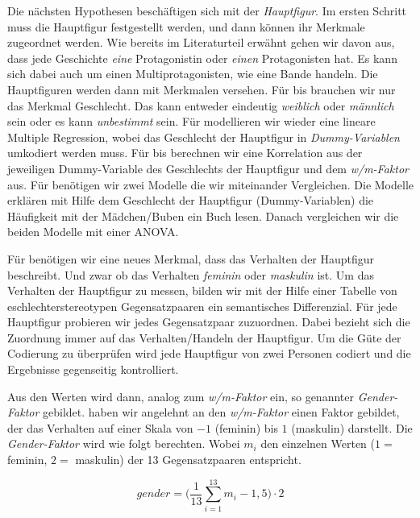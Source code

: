 Die nächsten Hypothesen beschäftigen sich mit der \emph{Hauptfigur}. Im
ersten Schritt muss die Hauptfigur festgestellt werden, und dann können
ihr Merkmale zugeordnet werden. Wie bereits im Literaturteil erwähnt
gehen wir davon aus, dass jede Geschichte \emph{eine} Protagonistin oder
\emph{einen} Protagonisten hat. Es kann sich dabei auch um einen
Multiprotagonisten, wie \zB eine Bande handeln. Die Hauptfiguren werden
dann mit Merkmalen versehen. Für  bis  brauchen
wir nur das Merkmal Geschlecht. Das kann entweder eindeutig
\emph{weiblich} oder \emph{männlich} sein oder es kann \emph{unbestimmt}
sein. Für  modellieren wir wieder eine lineare Multiple
Regression, wobei das Geschlecht der Hauptfigur in
\emph{Dummy-Variablen} umkodiert werden muss. Für  bis
 berechnen wir eine Korrelation aus der jeweiligen
Dummy-Variable des Geschlechts der Hauptfigur und dem \emph{w/m-Faktor}
aus. Für  benötigen wir zwei Modelle die wir miteinander
Vergleichen. Die Modelle erklären mit Hilfe dem Geschlecht der
Hauptfigur (Dummy-Variablen) die Häufigkeit mit der Mädchen/Buben ein
Buch lesen. Danach vergleichen wir die beiden Modelle mit einer ANOVA.

Für  benötigen wir eine neues Merkmal, dass das Verhalten der
Hauptfigur beschreibt. Und zwar ob das Verhalten \emph{feminin} oder
\emph{maskulin} ist. Um das Verhalten der Hauptfigur zu messen, bilden
wir mit der Hilfe einer Tabelle von eschlechterstereotypen
Gegensatzpaaren ein semantisches Differenzial.
\parencites[174\psq]{feldmann2006}[93\psqq]{Spillner1974} Für jede
Hauptfigur probieren wir jedes Gegensatzpaar zuzuordnen. Dabei bezieht
sich die Zuordnung immer auf das Verhalten/Handeln der Hauptfigur. Um
die Güte der Codierung zu überprüfen wird jede Hauptfigur von zwei
Personen codiert und die Ergebnisse gegenseitig kontrolliert.



Aus den Werten wird dann, analog zum \emph{w/m-Faktor} ein, so genannter
\emph{Gender-Faktor} gebildet. haben wir angelehnt an den
\emph{w/m-Faktor} einen Faktor gebildet, der das Verhalten auf einer
Skala von $-1$ (feminin) bis $1$ (maskulin) darstellt. Die
\emph{Gender-Faktor} wird wie folgt berechten. Wobei $m_i$ den einzelnen
Werten ($1=$ feminin, $2=$ maskulin) der 13 Gegensatzpaaren entspricht.

\begin{equation}
    gender=\Bigg(\frac{1}{13}\sum_{i=1}^{13}m_i-1{,}5\Bigg)\cdot 2
\end{equation}

